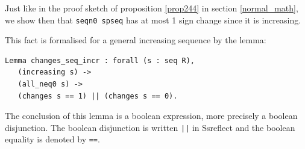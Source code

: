 \documentclass[11pt, a4paper]{article}
\begin{document}
\vspace*{0.3cm}

Just like in the proof sketch of proposition \ref{prop244} in section \ref{normal_math}, we show then that \lstinline!seqn0 spseq! has at most 1 sign change since it is increasing.

This fact is formalised for a general increasing sequence by the lemma:
\begin{lstlisting}
Lemma changes_seq_incr : forall (s : seq R),
   (increasing s) ->
   (all_neq0 s) ->
   (changes s == 1) || (changes s == 0).
\end{lstlisting} 
The conclusion of this lemma is a boolean expression, more precisely a boolean disjunction. The boolean disjunction is written \lstinline!||! in Ssreflect and the boolean equality is denoted by \lstinline!==!.
\end{document}
